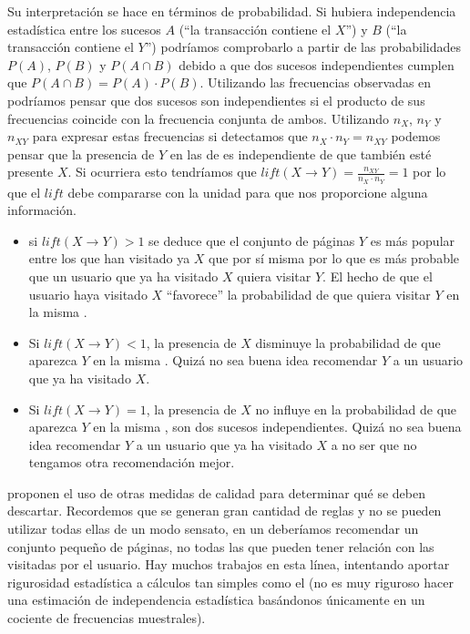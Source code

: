 Su interpretación se hace en términos de probabilidad. Si hubiera independencia estadística entre los sucesos $A$ ("`la transacción contiene el \itemset $X$"') y $B$ ("`la transacción contiene el \itemset $Y$"') podríamos comprobarlo a partir de las probabilidades $P(A)$, $P(B)$ y $P(A \cap B)$ debido a que dos sucesos independientes cumplen que $P(A \cap B) = P(A)\cdot P(B)$. Utilizando las frecuencias observadas en \D podríamos pensar que dos sucesos son independientes si el producto de sus frecuencias coincide con la frecuencia conjunta de ambos. Utilizando $n_X$, $n_Y$ y $n_{XY}$ para expresar estas frecuencias si detectamos que $n_X\cdot n_Y = n_{XY}$ podemos pensar que la presencia de $Y$ en las \transacciones de \D es independiente de que también esté presente $X$. Si ocurriera esto tendríamos que $lift(X \rightarrow Y) = \frac{n_{XY}}{n_X\cdot n_Y} = 1$ por lo que el $lift$ debe compararse con la unidad para que nos proporcione alguna información.

\begin{itemize}
  \item  si $lift(X \rightarrow Y) > 1$ se deduce que el conjunto de páginas $Y$ es más popular entre los que han visitado ya $X$ que por sí misma por lo que es más probable que un usuario que ya ha visitado $X$ quiera visitar $Y$. El hecho de que el usuario haya visitado $X$ "`favorece"' la probabilidad de que quiera visitar $Y$ en la misma \sn.
  \item Si $lift(X \rightarrow Y) < 1$, la presencia de $X$ disminuye la probabilidad de que aparezca $Y$ en la misma \sn. Quizá no sea buena idea recomendar $Y$ a un usuario que ya ha visitado $X$.
  \item Si $lift(X \rightarrow Y) = 1$, la presencia de $X$ no influye en la probabilidad de que aparezca $Y$ en la misma \sn, son dos sucesos independientes. Quizá no sea buena idea recomendar $Y$ a un usuario que ya ha visitado $X$ a no ser que no tengamos otra recomendación mejor.
\end{itemize}

\citet{AnCercone-RuleQualityMeasures-2001} proponen el uso de otras medidas de calidad para determinar qué \ARs se deben descartar. Recordemos que se generan gran cantidad de reglas y no se pueden utilizar todas ellas de un modo sensato, en un \srw deberíamos recomendar un conjunto pequeño de páginas, no todas las que pueden tener relación con las visitadas por el usuario. Hay muchos trabajos en esta línea, intentando aportar rigurosidad estadística a cálculos tan simples como el \lift (no es muy riguroso hacer una estimación de independencia estadística basándonos únicamente en un cociente de frecuencias muestrales).

